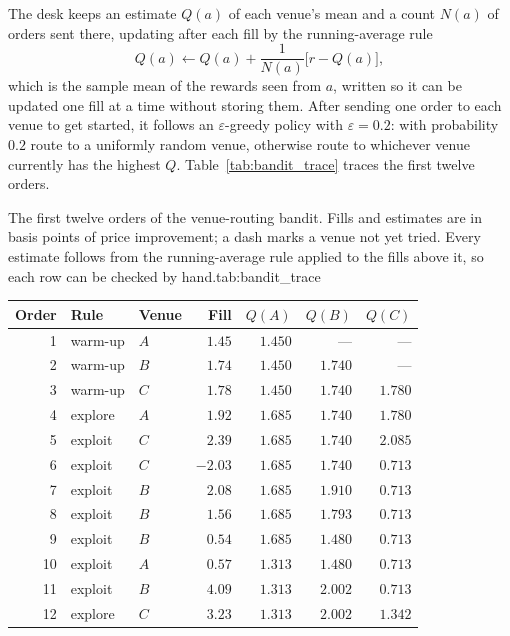 \documentclass[../ai_in_finance]{subfiles}
\begin{document}
The desk keeps an estimate $Q(a)$ of each venue's mean and a count $N(a)$ of orders sent there, updating after each fill by the running-average rule
\begin{equation}
Q(a) \leftarrow Q(a) + \frac{1}{N(a)}\big[r - Q(a)\big],
\label{eq:rl-bandit-update}
\end{equation}
which is the sample mean of the rewards seen from $a$, written so it can be updated one fill at a time without storing them. After sending one order to each venue to get started, it follows an $\varepsilon$-greedy policy with $\varepsilon=0.2$: with probability $0.2$ route to a uniformly random venue, otherwise route to whichever venue currently has the highest $Q$. Table~\ref{tab:bandit_trace} traces the first twelve orders.

\begin{booktable}{The first twelve orders of the venue-routing bandit. Fills and estimates are in basis points of price improvement; a dash marks a venue not yet tried. Every estimate follows from the running-average rule applied to the fills above it, so each row can be checked by hand.}{tab:bandit_trace}
\begin{tabular}{rllrrrr}
\toprule
Order & Rule & Venue & Fill & $Q(A)$ & $Q(B)$ & $Q(C)$ \\
\midrule
1 & warm-up & $A$ & $1.45$ & $1.450$ & --- & --- \\
2 & warm-up & $B$ & $1.74$ & $1.450$ & $1.740$ & --- \\
3 & warm-up & $C$ & $1.78$ & $1.450$ & $1.740$ & $1.780$ \\
4 & explore & $A$ & $1.92$ & $1.685$ & $1.740$ & $1.780$ \\
5 & exploit & $C$ & $2.39$ & $1.685$ & $1.740$ & $2.085$ \\
6 & exploit & $C$ & $-2.03$ & $1.685$ & $1.740$ & $0.713$ \\
7 & exploit & $B$ & $2.08$ & $1.685$ & $1.910$ & $0.713$ \\
8 & exploit & $B$ & $1.56$ & $1.685$ & $1.793$ & $0.713$ \\
9 & exploit & $B$ & $0.54$ & $1.685$ & $1.480$ & $0.713$ \\
10 & exploit & $A$ & $0.57$ & $1.313$ & $1.480$ & $0.713$ \\
11 & exploit & $B$ & $4.09$ & $1.313$ & $2.002$ & $0.713$ \\
12 & explore & $C$ & $3.23$ & $1.313$ & $2.002$ & $1.342$ \\
\bottomrule
\end{tabular}
\end{booktable}
\end{document}
